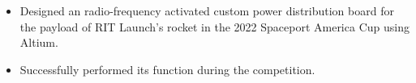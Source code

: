 \documentclass[]{deedy-resume-openfont}
\begin{document}
\begin{minipage}[t]{0.66\textwidth}
\sectionsep

\begin{itemize}
    \setlength\itemsep{0pt}
    \item Designed an radio-frequency activated custom power distribution board for the payload of RIT Launch's rocket in the 2022 Spaceport America Cup using Altium.
    \item Successfully performed its function during the competition.    
\end{itemize}






\end{minipage}
\end{document}
